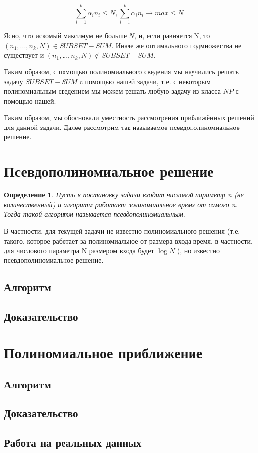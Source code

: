 \documentclass{article}
\newtheorem{definition}{Определение} %
\begin{document}
$$\sum\limits_{i = 1}^{k} {\alpha_i n_i} \leq N, \sum\limits_{i = 1}^{k} {\alpha_i n_i} \rightarrow max \leq N$$ 

Ясно, что искомый максимум не больше $N$, и, если равняется N, то $(n_1 , . . . , n_k , N ) \in SUBSET-SUM$. Иначе же оптимального подмножества не существует и $(n_1 , . . . , n_k , N ) \not\in SUBSET-SUM$.

Таким образом, с помощью полиномиального сведения мы научились решать задачу $SUBSET-SUM$ c помощью нашей задачи, т.е. с некоторым полиномиальным сведением мы можем решать любую задачу из класса $NP$ с помощью нашей.

Таким образом, мы обосновали уместность рассмотрения приближённых решений для данной задачи. Далее рассмотрим так называемое псевдополиномиальное решение. 


\section{Псевдополиномиальное решение}

	\begin{definition}
		Пусть в постановку задачи входит числовой параметр n (не количественный) и алгоритм работает полиномиальное время от самого n. Тогда такой алгоритм называется псевдополиномиальным.
	\end{definition}
	В частности, для текущей задачи не известно полиномиального решения (т.е. такого, которое работает за полиномиальное от размера входа время, в частности, для числового параметра N размером входа будет $\log{N}$ ), но известно псевдополиномиальное решение.
	
	\subsection{Алгоритм}
	
	
	
	\subsection{Доказательство}



\section{Полиномиальное приближение}
	\subsection{Алгоритм}
	\subsection{Доказательство}
	\subsection{Работа на реальных данных}
	
\end{document}
